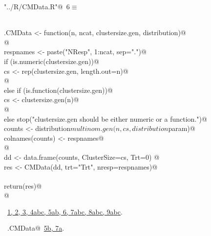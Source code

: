 \documentclass[reqno]{amsart}
\renewcommand{\NWtarget}[2]{\hypertarget{#1}{#2}}
\renewcommand{\NWlink}[2]{\hyperlink{#1}{#2}}
\begin{document}
\begin{flushleft} \small\label{scrap9}\raggedright\small
\NWtarget{nuweb6}{} \verb@"../R/CMData.R"@\nobreak\ {\footnotesize {6}}$\equiv$
\vspace{-1ex}
\begin{list}{}{} \item
\mbox{}\verb@@\\
\mbox{}\verb@ran.CMData <- function(n, ncat, clustersize.gen, distribution){@\\
\mbox{}\verb@  @\\
\mbox{}\verb@  respnames <- paste("NResp", 1:ncat, sep=".")@\\
\mbox{}\verb@  if (is.numeric(clustersize.gen)){@\\
\mbox{}\verb@    cs <- rep(clustersize.gen, length.out=n)@\\
\mbox{}\verb@  }@\\
\mbox{}\verb@  else if (is.function(clustersize.gen)){@\\
\mbox{}\verb@    cs <- clustersize.gen(n)@\\
\mbox{}\verb@  }@\\
\mbox{}\verb@  else stop("clustersize.gen should be either numeric or a function.")@\\
\mbox{}\verb@  counts <- distribution$multinom.gen(n, cs, distribution$param)@\\
\mbox{}\verb@  colnames(counts) <- respnames@\\
\mbox{}\verb@  @\\
\mbox{}\verb@  dd <- data.frame(counts, ClusterSize=cs, Trt=0)  @\\
\mbox{}\verb@  res <- CMData(dd, trt="Trt", nresp=respnames)@\\
\mbox{}\verb@@\\
\mbox{}\verb@  return(res)@\\
\mbox{}\verb@}@\\
\mbox{}\verb@@{\NWsep}
\end{list}
\vspace{-1.5ex}
\footnotesize
\begin{list}{}{\setlength{\itemsep}{-\parsep}\setlength{\itemindent}{-\leftmargin}}
\item \NWtxtFileDefBy\ \NWlink{nuweb1}{1}\NWlink{nuweb2}{, 2}\NWlink{nuweb3}{, 3}\NWlink{nuweb4a}{, 4a}\NWlink{nuweb4b}{b}\NWlink{nuweb4c}{c}\NWlink{nuweb5a}{, 5a}\NWlink{nuweb5b}{b}\NWlink{nuweb6}{, 6}\NWlink{nuweb7a}{, 7a}\NWlink{nuweb7b}{b}\NWlink{nuweb7c}{c}\NWlink{nuweb8a}{, 8a}\NWlink{nuweb8b}{b}\NWlink{nuweb8c}{c}\NWlink{nuweb9a}{, 9a}\NWlink{nuweb9b}{b}\NWlink{nuweb9c}{c}.
\item \NWtxtIdentsDefed\nobreak\  \verb@ran.CMData@\nobreak\ \NWlink{nuweb5b}{5b}\NWlink{nuweb7a}{, 7a}.
\item{}
\end{list}
\vspace{4ex}
\end{flushleft}
\end{document}
